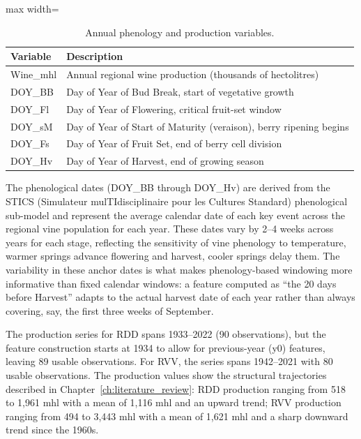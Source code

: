 \begin{table}[htbp]
  \centering
  \caption{Annual phenology and production variables.}\label{tab:ch3d_3}
  \small
  \begin{adjustbox}{max width=\textwidth}
    \begin{tabularx}{\textwidth}{l|X}
  \toprule
  Variable & Description \\
  \midrule
  Wine\_mhl & Annual regional wine production (thousands of hectolitres) \\
  DOY\_BB & Day of Year of Bud Break, start of vegetative growth \\
  DOY\_Fl & Day of Year of Flowering, critical fruit-set window \\
  DOY\_sM & Day of Year of Start of Maturity (veraison), berry ripening begins \\
  DOY\_Fs & Day of Year of Fruit Set, end of berry cell division \\
  DOY\_Hv & Day of Year of Harvest, end of growing season \\
  \bottomrule
\end{tabularx}
  \end{adjustbox}

\end{table}


The phenological dates (DOY\_BB through DOY\_Hv) are derived from the STICS (Simulateur mulTIdisciplinaire pour les Cultures Standard) phenological sub-model and represent the average calendar date of each key event across the regional vine population for each year. These dates vary by 2--4 weeks across years for each stage, reflecting the sensitivity of vine phenology to temperature, warmer springs advance flowering and harvest, cooler springs delay them. The variability in these anchor dates is what makes phenology-based windowing more informative than fixed calendar windows: a feature computed as ``the 20 days before Harvest'' adapts to the actual harvest date of each year rather than always covering, say, the first three weeks of September.

The production series for RDD spans 1933--2022 (90 observations), but the feature construction starts at 1934 to allow for previous-year (y0) features, leaving 89 usable observations. For RVV, the series spans 1942--2021 with 80 usable observations. The production values show the structural trajectories described in Chapter~\ref{ch:literature_review}: RDD production ranging from 518 to 1,961 mhl with a mean of 1,116 mhl and an upward trend; RVV production ranging from 494 to 3,443 mhl with a mean of 1,621 mhl and a sharp downward trend since the 1960s.


